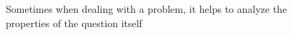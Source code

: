 \documentclass[preview]{standalone}
\begin{document}
\begin{center}
Sometimes when dealing with a problem, it helps to analyze the\\ properties of the question itself
\end{center}
\end{document}
